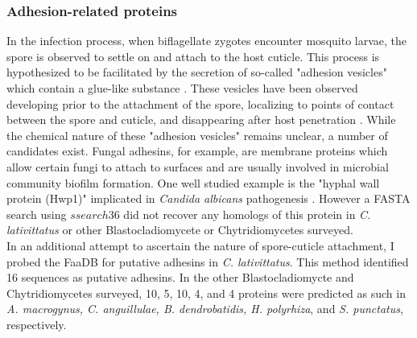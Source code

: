 \subsubsection*{Adhesion-related proteins}
In the infection process, when biflagellate zygotes encounter mosquito larvae, the spore is observed to settle on and attach to the host cuticle. This process is hypothesized to be facilitated by the secretion of so-called "adhesion vesicles" which contain a glue-like substance \cite{Travland1979}. These vesicles have been observed developing prior to the attachment of the spore, localizing to points of contact between the spore and cuticle, and disappearing after host penetration \cite{Travland1979}. While the chemical nature of these "adhesion vesicles" remains unclear, a number of candidates exist. Fungal adhesins, for example, are membrane proteins which allow certain fungi to attach to surfaces and are usually involved in microbial community biofilm formation. One well studied example is the "hyphal wall protein (Hwp1)" implicated in \textit{Candida albicans} pathogenesis \cite{Staab1999}. However a FASTA search using $ssearch36$ did not recover any homologs of this protein in \textit{C. lativittatus} or other Blastocladiomycete or Chytridiomycetes surveyed.\\
\indent In an additional attempt to ascertain the nature of spore-cuticle attachment, I probed the FaaDB for putative adhesins in \textit{C. lativittatus}. This method identified 16 sequences as putative adhesins. In the other Blastocladiomycte and Chytridiomycetes surveyed, 10, 5, 10, 4, and 4 proteins were predicted as such in \textit{A. macrogynus, C. anguillulae, B. dendrobatidis, H. polyrhiza}, and \textit{S. punctatus}, respectively.\\
